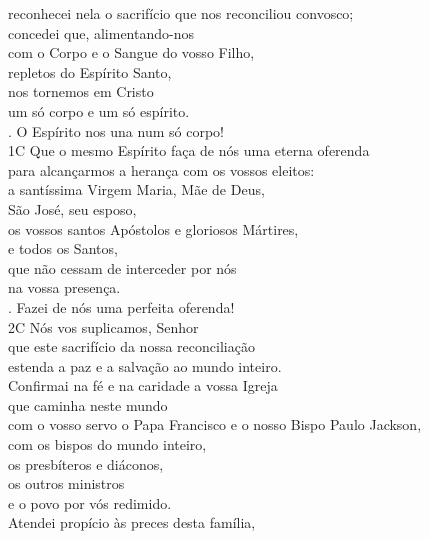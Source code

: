 \documentclass{book}
\begin{document}
\begin{flushleft}
    reconhecei nela o sacrifício que nos reconciliou convosco; \\
    concedei que, alimentando-nos \\
    com o Corpo e o Sangue do vosso Filho, \\
    repletos do Espírito Santo, \\
    nos tornemos em Cristo \\
    um só corpo e um só espírito.
    \vspace{.2cm} \\
    {\color{VioletRed2} \Rbar.} O Espírito nos una num só corpo!
    \vspace{.2cm} \\
    {\color{VioletRed2}1C} Que o mesmo Espírito faça de nós uma eterna oferenda \\
    para alcançarmos a herança com os vossos eleitos: \\
    a santíssima Virgem Maria, Mãe de Deus, \\
    São José, seu esposo, \\
    os vossos santos Apóstolos e gloriosos Mártires, \\
    e todos os Santos, \\
    que não cessam de interceder por nós \\
    na vossa presença.
    \vspace{.2cm} \\
    {\color{VioletRed2} \Rbar.} Fazei de nós uma perfeita oferenda!
    \vspace{.2cm} \\
    {\color{VioletRed2}2C} Nós vos suplicamos, Senhor \\
    que este sacrifício da nossa reconciliação \\
    estenda a paz e a salvação ao mundo inteiro. \\
    Confirmai na fé e na caridade a vossa Igreja \\
    que caminha neste mundo \\
    com o vosso servo o Papa Francisco e o nosso Bispo Paulo Jackson, \\
    com os bispos do mundo inteiro, \\
    os presbíteros e diáconos, \\
    os outros ministros \\
    e o povo por vós redimido.
    \vspace{.2cm} \\
    Atendei propício às preces desta família, \\

\end{flushleft}
\end{document}
